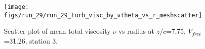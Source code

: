 \begin{figure}[H]
\centering
\texttt{[image: figs/run\_29/run\_29\_turb\_visc\_by\_vtheta\_vs\_r\_meshscatter]}
\caption{Scatter plot of mean total viscosity $\nu$ vs radius at $z/c$=7.75, $V_{free}$=31.26, station 3.}
\label{fig:run_29_turb_visc_by_vtheta_vs_r_meshscatter}
\end{figure}


